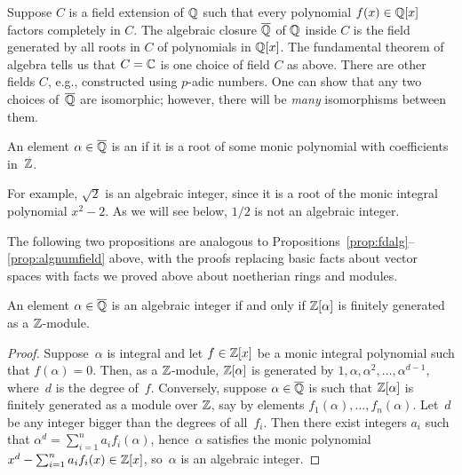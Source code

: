 Suppose $C$ is a field extension of $\mathbb{Q}$ such that every polynomial
$f(x)\in \mathbb{Q}[x]$ factors completely in $C$.
The algebraic closure $\overline{\mathbb{Q}}$ of $\mathbb{Q}$ inside $C$
is the  field generated by all roots in $C$ of polynomials
in $\mathbb{Q}[x]$.
The fundamental theorem of algebra tells us that
$C=\mathbb{C}$ is one choice of field $C$ as above.
There are other fields $C$, e.g., constructed using $p$-adic numbers.
One can show that any two choices of~$\overline{\mathbb{Q}}$ are isomorphic; however,
there will be {\em many} isomorphisms between them.

\begin{definition}
  An element $\alpha\in\overline{\mathbb{Q}}$ is an  if it
  is a root of some monic polynomial with coefficients in~$\mathbb{Z}$.
\end{definition}
For example, $\sqrt{2}$ is an algebraic integer, since it is a root
of the monic integral polynomial $x^2-2$. As we will see below,
$1/2$ is not an algebraic integer.

The following two propositions are analogous to
Propositions~\ref{prop:fdalg}--\ref{prop:algnumfield} above, with
the proofs replacing basic facts about vector spaces with facts we
proved above about noetherian rings and modules.

\begin{proposition}
  \label{prop:intfg}
  An element $\alpha\in\overline{\mathbb{Q}}$ is an algebraic integer if and
  only if $\mathbb{Z}[\alpha]$ is finitely generated as a $\mathbb{Z}$-module.
\end{proposition}
\begin{proof}
  Suppose~$\alpha$ is integral and let $f\in\mathbb{Z}[x]$ be a monic
  integral polynomial such that $f(\alpha)=0$.  Then, as a
  $\mathbb{Z}$-module, $\mathbb{Z}[\alpha]$ is generated by
  $1,\alpha,\alpha^2,\dots,\alpha^{d-1}$, where~$d$ is
  the degree of~$f$. Conversely, suppose $\alpha\in\overline{\mathbb{Q}}$ is such
  that $\mathbb{Z}[\alpha]$ is finitely generated as a module over $\mathbb{Z}$,
  say by elements $f_1(\alpha), \dots, f_n(\alpha)$. Let~$d$ be
  any integer bigger than the degrees of all~$f_i$. Then there exist
  integers $a_i$ such that $\alpha^d = \sum_{i=1}^n a_i f_i(\alpha)$,
  hence~$\alpha$ satisfies the monic polynomial
  $x^d - \sum_{i=1}^n a_i f_i(x) \in \mathbb{Z}[x]$, so~$\alpha$
  is an algebraic integer.
\end{proof}

